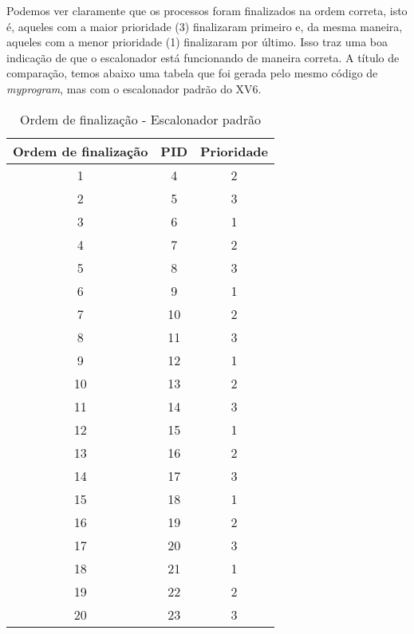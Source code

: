 \documentclass{article}
\begin{document}
Podemos ver claramente que os processos foram finalizados na ordem correta,
isto é, aqueles com a maior prioridade (3) finalizaram primeiro e, da mesma
maneira, aqueles com a menor prioridade (1) finalizaram por último. Isso traz
uma boa indicação de que o escalonador está funcionando de maneira correta. A
título de comparação, temos abaixo uma tabela que foi gerada pelo mesmo código
de \textit{myprogram}, mas com o escalonador padrão do XV6.

\begin{table}[H]
      \centering
      \begin{tabular}{|c|c|c|}
            \hline
            \textbf{Ordem de finalização} & \textbf{PID} & \textbf{Prioridade}
            \\
            \hline
            1                             & 4            & 2
            \\
            2                             & 5            & 3
            \\
            3                             & 6            & 1
            \\
            4                             & 7            & 2
            \\
            5                             & 8            & 3
            \\
            6                             & 9            & 1
            \\
            7                             & 10           & 2
            \\
            8                             & 11           & 3
            \\
            9                             & 12           & 1
            \\
            10                            & 13           & 2
            \\
            11                            & 14           & 3
            \\
            12                            & 15           & 1
            \\
            13                            & 16           & 2
            \\
            14                            & 17           & 3
            \\
            15                            & 18           & 1
            \\
            16                            & 19           & 2
            \\
            17                            & 20           & 3
            \\
            18                            & 21           & 1
            \\
            19                            & 22           & 2
            \\
            20                            & 23           & 3
            \\
            \hline
      \end{tabular}
      \caption{Ordem de finalização - Escalonador padrão}
      \label{tab:tabela_indexada}
\end{table}
\end{document}
